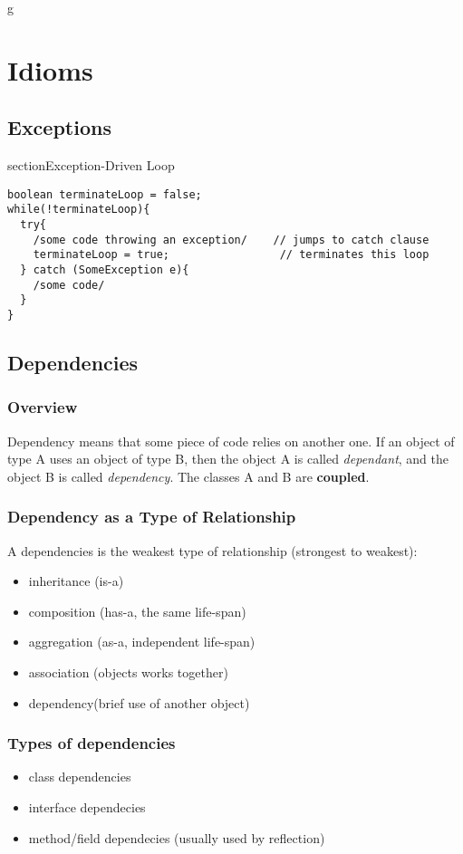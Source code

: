 \documentclass{report}
\begin{document}
g
\part{Idioms}



\chapter{Exceptions}
section{Exception-Driven Loop}
\begin{verbatim}
boolean terminateLoop = false;
while(!terminateLoop){
  try{
    /some code throwing an exception/    // jumps to catch clause
    terminateLoop = true;                 // terminates this loop
  } catch (SomeException e){
    /some code/
  }
}
\end{verbatim}








\chapter{Dependencies}
\section{Overview}
Dependency means that some piece of code relies on another one. If an object of type A uses an object of type B, 
then the object A is called \textit{dependant}, and the object B is called \textit{dependency}. The classes A and B are \textbf{coupled}. 

\section{Dependency as a Type of Relationship}
A dependencies is the weakest
type of relationship (strongest to weakest):
\begin{itemize}
	\item inheritance (is-a)
	\item composition (has-a, the same life-span)
	\item aggregation (as-a, independent life-span)
	\item association (objects works together)
	\item dependency(brief use of another object)
\end{itemize}

\section{Types of dependencies}
\begin{itemize}
	\item class dependencies
	\item interface dependecies
	\item method/field dependecies (usually used by reflection)
\end{itemize}
\end{document}

